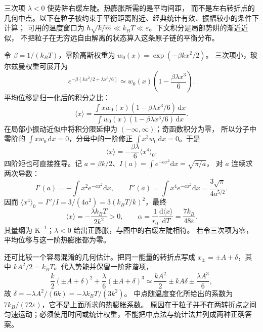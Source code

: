 \begin{xesolution}
三次项 $\lambda<0$ 使势阱右缓左陡。热膨胀所需的是平均间距，
而不是左右转折点的几何中点。以下在粒子被约束于平衡距离附近、经典统计有效、振幅较小的条件下计算；
可用的温度窗口为 $\hbar\sqrt{k/m}\ll k_BT\ll\varepsilon$。下文积分是局部势阱的渐近近似，
不把粒子在无穷远自由解离的状态算入这条原子链的平衡分布。

令 $\beta=1/(k_BT)$，零阶高斯权重为 $w_0(x)=\exp(-\beta kx^2/2)$。
三次项小，玻尔兹曼权重可展开为
\[
 e^{-\beta(kx^2/2+\lambda x^3/6)}
 \simeq w_0(x)\left(1-\frac{\beta\lambda x^3}{6}\right).
\]
平均位移是归一化后的积分之比：
\[
 \langle x\rangle=
 \frac{\int xw_0(x)(1-\beta\lambda x^3/6)\,\mathrm dx}
 {\int w_0(x)(1-\beta\lambda x^3/6)\,\mathrm dx}.
\]
在局部小振动近似中将积分限延伸为 $(-\infty,\infty)$；奇函数积分为零，
所以分子中零阶的 $\int xw_0\,\mathrm dx=0$，分母中的一阶修正
$\int x^3w_0\,\mathrm dx=0$。于是
\[
 \langle x\rangle=-\frac{\beta\lambda}{6}\langle x^4\rangle_0.
\]
四阶矩也可直接推导。记 $a=\beta k/2$、$I(a)=\int e^{-ax^2}\mathrm dx=\sqrt{\pi/a}$，
对 $a$ 连续求两次导数：
\[
 I'(a)=-\int x^2e^{-ax^2}\mathrm dx,\qquad
 I''(a)=\int x^4e^{-ax^2}\mathrm dx=\frac{3\sqrt\pi}{4a^{5/2}}.
\]
因而 $\langle x^4\rangle_0=I''/I=3/(4a^2)=3(k_BT/k)^2$，最终
\[
 \langle x\rangle=-\frac{\lambda k_BT}{2k^2}>0,\qquad
 \boxed{\alpha=\frac1{r_0}\frac{\mathrm d\langle x\rangle}{\mathrm dT}
 =\frac{7k_B}{48\varepsilon}}.
\]
其量纲为 $\mathrm K^{-1}$；$\lambda<0$ 给出正膨胀，与图中的右缓左陡相符。
若令三次项为零，平均位移与这一阶热膨胀都为零。

还可比较一个容易混淆的几何估计。把同一能量的转折点写成
$x_\pm=\pm A+\delta$，其中 $kA^2/2=k_BT$。代入势能并保留一阶非谐项，
\[
 \frac{k}{2}(\pm A+\delta)^2+\frac{\lambda}{6}(\pm A+\delta)^3
 \simeq\frac{kA^2}{2}\pm kA\delta\pm\frac{\lambda A^3}{6},
\]
故 $\delta=-\lambda A^2/(6k)=-\lambda k_BT/(3k^2)$。
中点随温度变化所给出的系数为 $7k_B/(72\varepsilon)$，它不是上面所求的热膨胀系数。
原因在于粒子并不在两转折点之间匀速运动；必须使用时间或统计权重，不能把中点法与统计法并列成两种正确答案。
\end{xesolution}

